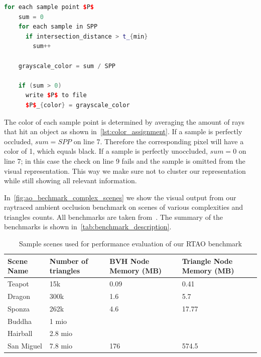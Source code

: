 \begin{minipage}{\linewidth}
\begin{lstlisting}[mathescape=true, caption={Assigning color to each sample point}, label={lst:color_assignment}, language=C++]
  for each sample point $P$
    sum = 0
    for each sample in SPP 
      if intersection_distance > t_{min}
        sum++

    grayscale_color = sum / SPP

    if (sum > 0) 
      write $P$ to file
      $P$_{color} = grayscale_color
\end{lstlisting}
\end{minipage}

The color of each sample point is determined by averaging the amount of rays that hit an object as shown in~\autoref{lst:color_assignment}. If a sample is perfectly occluded, $sum = SPP$ on line 7. Therefore the corresponding pixel will have a color of 1, which equals black. If a sample is perfectly unoccluded, $sum = 0$ on line 7; in this case the check on line 9 fails and the sample is omitted from the visual representation. This way we make sure not to cluster our representation while still showing all relevant information. 



In~\autoref{fig:ao_bechmark_complex_scenes} we show the visual output from our raytraced ambient occlusion benchmark on scenes of various complexities and triangles counts. All benchmarks are taken from~\cite{McGuire2017Data}. The summary of the benchmarks is shown in~\autoref{tab:benchmark_description}.

\begin{table}
\begin{tabular}{ |p{3cm}||p{3cm}|p{3cm}|p{3cm}|  }
 \hline
 Scene Name & Number of triangles & BVH Node Memory (MB) & Triangle Node Memory (MB) \\
 \hline
 Teapot     & 15k     & 0.09  & 0.41 \\
 Dragon     & 300k    & 1.6   & 5.7 \\
 Sponza     & 262k    & 4.6   & 17.77 \\
 Buddha     & 1 mio   & ~\note{}  & ~\note{} \\
 Hairball   & 2.8 mio & ~\note{}  & ~\note{} \\
 San Miguel & 7.8 mio & 176   & 574.5 \\
 \hline
\end{tabular}
\caption{\label{tab:benchmark_description}Sample scenes used for performance evaluation of our RTAO benchmark}
\end{table}

